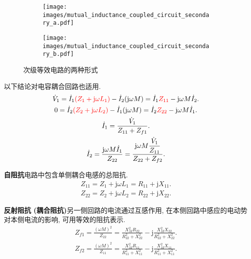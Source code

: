 \begin{figure}[H]
    \begin{center}
        \begin{subfigure}{.2868\textwidth}
            \centering
            \texttt{[image: images/mutual\_inductance\_coupled\_circuit\_secondary\_a.pdf]}
            \caption{}
        \end{subfigure}
        \begin{subfigure}{.3132\textwidth}
            \centering
            \texttt{[image: images/mutual\_inductance\_coupled\_circuit\_secondary\_b.pdf]}
            \caption{}
        \end{subfigure}
        \caption{次级等效电路的两种形式}
    \end{center}
\end{figure}

以下结论对电容耦合回路也适用.
\begin{gather} \label{eq:2.4 basic equations and currents}
    \dot{V}_1=\dot{I}_1{\color{red} (Z_1+\mathrm{j}\omega L_1)}-\dot{I}_2(\mathrm{j}\omega M)=\dot{I}_1{\color{red} Z_{11}}-\mathrm{j}\omega M\dot{I}_2. \\
    0=\dot{I}_2{\color{red} (Z_2+\mathrm{j}\omega L_2)}-\dot{I}_1(\mathrm{j}\omega M)=\dot{I}_2{\color{red} Z_{22}}-\mathrm{j}\omega M\dot{I}_1. \\
    \dot{I}_1=\frac{\dot{V}_1}{Z_{11}+Z_{f1}}. \label{eq:2.4 I_1}  \\
    \dot{I}_2=\frac{\mathrm{j}\omega M\dot{I}_1}{Z_{22}}=\frac{\mathrm{j}\omega M\dfrac{\dot{V}_1}{Z_{11}}}{Z_{22}+Z_{f2}}. \label{eq:2.4 I_2}
\end{gather}

\textbf{自阻抗}\quad 电路中包含单侧耦合电感的总阻抗.
\begin{gather}
    Z_{11}=Z_1+\mathrm{j}\omega L_1=R_{11}+\mathrm{j}X_{11}. \\
    Z_{22}=Z_2+\mathrm{j}\omega L_2=R_{22}+\mathrm{j}X_{22}.
\end{gather}

\textbf{反射阻抗 (耦合阻抗)}\quad 另一侧回路的电流通过互感作用, 在本侧回路中感应的电动势对本侧电流的影响, 可用等效的阻抗表示.
\begin{gather}
    Z_{f1}=\frac{(\omega M)^2}{Z_{22}}=\frac{X_M^2R_{22}}{R_{22}^2+X_{22}^2}-\mathrm{j}\frac{X_M^2X_{22}}{R_{22}^2+X_{22}^2}. \\
    Z_{f2}=\frac{(\omega M)^2}{Z_{11}}=\frac{X_M^2R_{11}}{R_{11}^2+X_{11}^2}-\mathrm{j}\frac{X_M^2X_{11}}{R_{11}^2+X_{11}^2}.
\end{gather}

